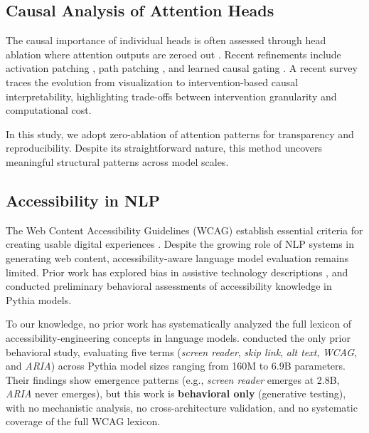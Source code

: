 \documentclass[10pt]{article} %
\begin{document}
\subsection{Causal Analysis of Attention Heads}

The causal importance of individual heads is often assessed through head ablation where attention outputs are zeroed out \citep{voita2019analyzing,michel2019sixteen}.
Recent refinements include activation patching \citep{meng2022locating,wang2023interpretability}, path patching \citep{goldowsky2023localizing}, and learned causal gating \citep{nam2025causal}.
A recent survey \citep{kadem2026interpreting} traces the evolution from visualization to intervention-based causal interpretability, highlighting trade-offs between intervention granularity and computational cost.

In this study, we adopt zero-ablation of attention patterns for transparency and reproducibility.
Despite its straightforward nature, this method uncovers meaningful structural patterns across model scales.

\subsection{Accessibility in NLP}

The Web Content Accessibility Guidelines (WCAG) establish essential criteria for creating usable digital experiences \citep{w3c2018wcag}.
Despite the growing role of NLP systems in generating web content, accessibility-aware language model evaluation remains limited.
Prior work has explored bias in assistive technology descriptions \citep{trewin2019considerations}, and \citet{salas2026testing} conducted preliminary behavioral assessments of accessibility knowledge in Pythia models.

To our knowledge, no prior work has systematically analyzed the full lexicon of accessibility-engineering concepts in language models.
\citet{salas2026testing} conducted the only prior behavioral study, evaluating five terms (\textit{screen reader}, \textit{skip link}, \textit{alt text}, \textit{WCAG}, and \textit{ARIA}) across Pythia model sizes ranging from 160M to 6.9B parameters.
Their findings show emergence patterns (e.g., \textit{screen reader} emerges at 2.8B, \textit{ARIA} never emerges), but this work is \textbf{behavioral only} (generative testing), with no mechanistic analysis, no cross-architecture validation, and no systematic coverage of the full WCAG lexicon.
\end{document}
